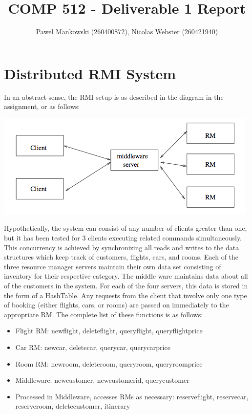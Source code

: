 \documentclass[11pt]{amsart}
\title{COMP 512 - Deliverable 1 Report}
\author{Pawel Mankowski (260400872), Nicolas Webster (260421940)}
\begin{document}
\maketitle

\section{Distributed RMI System}

In an abstract sense, the RMI setup is as described in the diagram in the assignment, or as follows:\\

\begin{center}
\includegraphics[scale=0.8]{images/image1.png}
\end{center}

Hypothetically, the system can consist of any number of clients greater than one, but it has been tested for 3 clients executing related commands
simultaneously. This concurrency is achieved by synchronizing all reads and writes to the data structures which keep track of customers, flights,
cars, and rooms. Each of the three resource manager servers maintain their own data set consisting of inventory for their respective category. The
middle ware maintains data about all of the customers in the system. For each of the four servers,
this data is stored in the form of a HashTable. Any requests from the client that involve only one
type of booking (either flights, cars, or rooms) are passed on immediately to the appropriate RM. The complete list of these functions is as follows:
\begin{itemize}
 	\item Flight RM: newflight, deleteflight, queryflight, queryflightprice
 	\item Car RM: newcar, deletecar, querycar, querycarprice
 	\item Room RM: newroom, deleteroom, queryroom, queryroomprice
 	\item Middleware: newcustomer, newcustomerid, querycustomer
 	\item Processed in Middleware, accesses RMs as necessary: reserveflight, reservecar, reserveroom,
 	deletecustomer, itinerary
\end{itemize}
\end{document}

